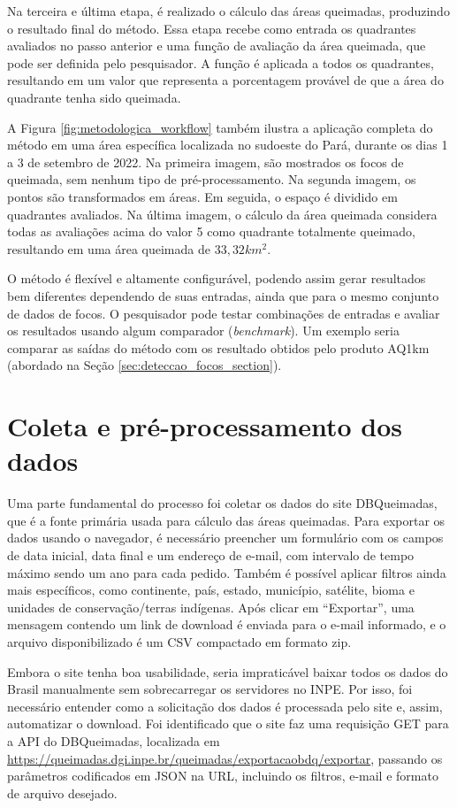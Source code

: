 \documentclass[cic,tc]{iiufrgs}
\begin{document}
Na terceira e última etapa, é realizado o cálculo das áreas queimadas, produzindo o resultado final do método. Essa etapa recebe como entrada os quadrantes avaliados no passo anterior e uma função de avaliação da área queimada, que pode ser definida pelo pesquisador. A função é aplicada a todos os quadrantes, resultando em um valor que representa a porcentagem provável de que a área do quadrante tenha sido queimada.

A Figura \ref{fig:metodologica_workflow} também ilustra a aplicação completa do método em uma área específica localizada no sudoeste do Pará, durante os dias 1 a 3 de setembro de 2022. Na primeira imagem, são mostrados os focos de queimada, sem nenhum tipo de pré-processamento. Na segunda imagem, os pontos são transformados em áreas. Em seguida, o espaço é dividido em quadrantes avaliados. Na última imagem, o cálculo da área queimada considera todas as avaliações acima do valor 5 como quadrante totalmente queimado, resultando em uma área queimada de $33,32 km^2$.

O método é flexível e altamente configurável, podendo assim gerar resultados bem diferentes dependendo de suas entradas, ainda que para o mesmo conjunto de dados de focos. O pesquisador pode testar combinações de entradas e avaliar os resultados usando algum comparador (\textit{benchmark}). Um exemplo seria comparar as saídas do método com os resultado obtidos pelo produto AQ1km (abordado na Seção \ref{sec:deteccao_focos_section}).

\section{Coleta e pré-processamento dos dados}

Uma parte fundamental do processo foi coletar os dados do site DBQueimadas, que é a fonte primária usada para cálculo das áreas queimadas. Para exportar os dados usando o navegador, é necessário preencher um formulário com os campos de data inicial, data final e um endereço de e-mail, com intervalo de tempo máximo sendo um ano para cada pedido. Também é possível aplicar filtros ainda mais específicos, como continente, país, estado, município, satélite, bioma e unidades de conservação/terras indígenas. Após clicar em ``Exportar'', uma mensagem contendo um link de download é enviada para o e-mail informado, e o arquivo disponibilizado é um CSV compactado em formato zip.

Embora o site tenha boa usabilidade, seria impraticável baixar todos os dados do Brasil manualmente sem sobrecarregar os servidores no INPE. Por isso, foi necessário entender como a solicitação dos dados é processada pelo site e, assim, automatizar o download. Foi identificado que o site faz uma requisição GET para a API do DBQueimadas, localizada em \url{https://queimadas.dgi.inpe.br/queimadas/exportacaobdq/exportar}, passando os parâmetros codificados em JSON na URL, incluindo os filtros, e-mail e formato de arquivo desejado.
\end{document}
